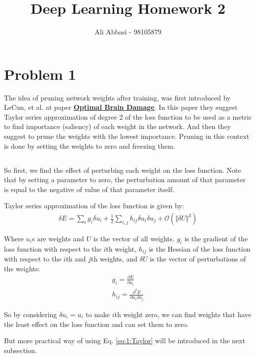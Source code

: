 \documentclass[]{article}
\title{Deep Learning Homework 2}
\author{Ali Abbasi - 98105879}
\numberwithin{equation}{section}
\newcommand{\norm}[2][]{\Vert #2\Vert_{#1}}
\begin{document}
\maketitle
\section{Problem 1}
The idea of pruning network weights after training, was first introduced by LeCun, et al. at paper \textbf{\href{https://proceedings.neurips.cc/paper/1989/file/6c9882bbac1c7093bd25041881277658-Paper.pdf}{Optimal Brain Damage}}.
In this paper they suggest Taylor series approximation of degree 2 of the loss function to be used as a metric to find importance (saliency) of each weight in the network.
And then they suggest to prune the weights with the lowest importance. Pruning in this context is done by setting the weights to zero and freezing them.

\subsection{}
So first, we find the effect of perturbing each weight on the loss function.
Note that by setting a parameter to zero, the perturbation amount of that parameter is equal to the negative of value of that parameter itself.

Taylor series approximation of the loss function is given by:
\begin{align}
\label{eq:1:Taylor}
\delta E = \sum_i g_i \delta u_i + \frac{1}{2} \sum_{i, j} h_{ij} \delta u_i \delta u_j + \mathcal{O}(\norm{\delta U}^3) 
\end{align}

Where $u_i$s are weights and $U$ is the vector of all weights.
$g_i$ is the gradient of the loss function with respect to the $i$th weight, $h_{ij}$ is the Hessian of the loss function with respect to the $i$th and $j$th weights, and $\delta U$ is the vector of perturbations of the weights:
\begin{align}
g_i = \frac{\partial E}{\partial u_i} \\
h_{ij} = \frac{\partial^2 E}{\partial u_i \partial u_j}
\end{align}

So by considering \(\delta u_i = u_i\) to make \(i\)th weight zero, we can find weights that have the least effect on the loss function and can set them to zero.

But more practical way of using Eq. \ref{eq:1:Taylor} will be introduced in the next subsection.
\end{document}
